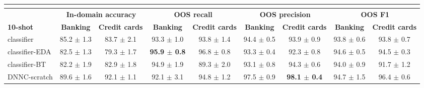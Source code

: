 \begin{table}[h]
{\begin{tabular}{lcccccccc}
                                      & \multicolumn{1}{l}{}                 & \multicolumn{1}{l}{}                                      & \multicolumn{1}{l}{}                 & \multicolumn{1}{l}{}                                      & \multicolumn{1}{l}{}                 & \multicolumn{1}{l}{}                                      & \textbf{}                            & \textbf{}                            \\ \hline
\multicolumn{1}{l|}{}                 & \multicolumn{2}{c|}{\textbf{In-domain accuracy}}                                                 & \multicolumn{2}{c|}{\textbf{OOS recall}}                                                         & \multicolumn{2}{c|}{\textbf{OOS precision}}                                                      & \multicolumn{2}{c}{\textbf{OOS F1}}                                         \\
\multicolumn{1}{l|}{\textbf{10-shot}} & \textbf{Banking}                     & \multicolumn{1}{c|}{\textbf{Credit cards}}               & \textbf{Banking}                     & \multicolumn{1}{c|}{\textbf{Credit cards}}               & \textbf{Banking}                     & \multicolumn{1}{c|}{\textbf{Credit cards}}               & \textbf{Banking}                     & \textbf{Credit cards}               \\ \hline
\multicolumn{1}{l|}{classifier}       & 85.2 $\pm$ 1.3          & \multicolumn{1}{c|}{83.7 $\pm$ 2.1}          & 93.3 $\pm$ 1.0          & \multicolumn{1}{c|}{93.8 $\pm$ 1.4}          & 94.4 $\pm$ 0.5          & \multicolumn{1}{c|}{93.9 $\pm$ 0.9}          & 93.8 $\pm$ 0.6          & 93.8 $\pm$ 0.7          \\
\multicolumn{1}{l|}{classifier-EDA}   & 82.5 $\pm$ 1.3          & \multicolumn{1}{c|}{79.3 $\pm$ 1.7}          & \textbf{95.9 $\pm$ 0.8} & \multicolumn{1}{c|}{96.8 $\pm$ 0.8}          & 93.3 $\pm$ 0.4          & \multicolumn{1}{c|}{92.3 $\pm$ 0.8}          & 94.6 $\pm$ 0.5          & 94.5 $\pm$ 0.3          \\
\multicolumn{1}{l|}{classifier-BT}    & 82.2 $\pm$ 1.9          & \multicolumn{1}{c|}{82.9 $\pm$ 1.8}          & 94.9 $\pm$ 1.9          & \multicolumn{1}{c|}{89.3 $\pm$ 2.0}          & 93.1 $\pm$ 0.8          & \multicolumn{1}{c|}{94.3 $\pm$ 0.6}          & 94.0 $\pm$ 0.9         & 91.7 $\pm$ 1.2          \\
\multicolumn{1}{l|}{DNNC-scratch}      & 89.6 $\pm$ 1.6          & \multicolumn{1}{c|}{92.1 $\pm$ 1.1}          & 92.1 $\pm$ 3.1          & \multicolumn{1}{c|}{94.8 $\pm$ 1.2}          & 97.5 $\pm$ 0.9          & \multicolumn{1}{c|}{\textbf{98.1 $\pm$ 0.4}} & 94.7 $\pm$ 1.5          & 96.4 $\pm$ 0.6          \\

\end{tabular}}
\end{table}
